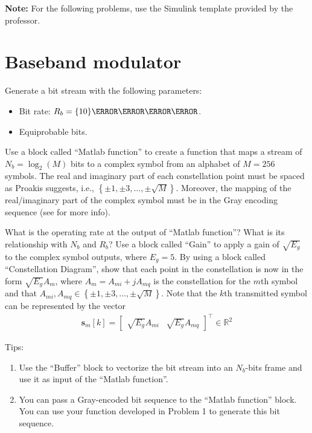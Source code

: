 \documentclass[12pt,a4paper]{article}
\begin{document}
\textbf{Note:} For the following problems, use the Simulink template provided by the professor.

\section{Baseband modulator}

\problem \label{probtwo}
Generate a bit stream with the following parameters:
\begin{itemize}
    \item Bit rate: \(R_b = \qty{10}{\mega\bit\per\second}\).
    \item Equiprobable bits.
\end{itemize}

\problem \label{probthree}
Use a block called ``Matlab function'' to create a function that maps a stream of \(N_b = \log_2\left( M \right)\) bits to a complex symbol from an alphabet of \(M=256\) symbols. The real and imaginary part of each constellation point must be spaced as Proakis suggests, i.e., \(\left\{ \pm1, \pm3, \dots, \pm\sqrt{M} \right\}\). Moreover, the mapping of the real/imaginary part of the complex symbol must be in the Gray encoding sequence (see \cite{proakisDigitalCommunications2007} for more info).

\subproblem What is the operating rate at the output of ``Matlab function''? What is its relationship with \(N_b\) and \(R_b\)?
\subproblem Use a block called ``Gain'' to apply a gain of \(\sqrt{E_g}\) to the complex symbol outputs, where \(E_g = 5\).
\subproblem By using a block called ``Constellation Diagram'', show that each point in the constellation is now in the form \(\sqrt{E_g} A_m\), where \(A_m = A_{mi}+j A_{mq}\) is the constellation for the \(m\)th symbol and that \(A_{mi}, A_{mq} \in \left\{ \pm1, \pm3, \dots, \pm\sqrt{M} \right\}\). Note that the \(k\)th transmitted symbol can be represented by the vector
\begin{align}
    \mathbf{s}_m\left[ k \right] = \begin{bmatrix}
        \sqrt{E_g}A_{mi} & \sqrt{E_g}A_{mq}
    \end{bmatrix}^\top \in \mathbb{R}^{2}
\end{align}

Tips:
\begin{enumerate}
    \item Use the ``Buffer'' block to vectorize the bit stream into an \(N_b\)-bits frame and use it as input of the ``Matlab function''.
    \item You can pass a Gray-encoded bit sequence to the ``Matlab function'' block. You can use your function developed in Problem 1 to generate this bit sequence.
\end{enumerate}
\end{document}

